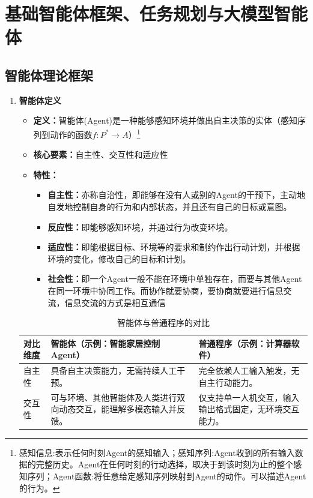 \documentclass[../main.tex]{subfiles}
\begin{document}
\section{基础智能体框架、任务规划与大模型智能体}\label{sec:agent-framework}
\subsection{智能体理论框架}\label{sec:agent-theory}
\begin{enumerate}
    \item \textbf{智能体定义}
    \begin{itemize}
        \item \textbf{定义：}智能体(Agent)是一种能够感知环境并做出自主决策的实体（感知序列到动作的函数$f:P^*\rightarrow A$）\footnote{感知信息:表示任何时刻Agent的感知输入；感知序列:Agent收到的所有输入数据的完整历史。Agent在任何时刻的行动选择，取决于到该时刻为止的整个感知序列；Agent函数:将任意给定感知序列映射到Agent的动作。可以描述Agent的行为。}
        \item \textbf{核心要素：}自主性、交互性和适应性
        \item \textbf{特性：}
        \begin{itemize}
            \item \textbf{自主性：}亦称自治性，即能够在没有人或别的Agent的干预下，主动地自发地控制自身的行为和内部状态，并且还有自己的目标或意图。
            \item \textbf{反应性：}即能够感知环境，并通过行为改变环境。
            \item \textbf{适应性：}即能根据目标、环境等的要求和制约作出行动计划，并根据环境的变化，修改自己的目标和计划。
            \item \textbf{社会性：}即一个Agent一般不能在环境中单独存在，而要与其他Agent在同一环境中协同工作。而协作就要协商，要协商就要进行信息交流，信息交流的方式是相互通信
        \end{itemize}
    \end{itemize}
    \begin{table}[H]
    \centering
    \caption{智能体与普通程序的对比}
    \begin{tabular}{p{2.6cm}p{6.2cm}p{6.2cm}}
        \toprule
        对比维度 & 智能体（示例：智能家居控制 Agent） & 普通程序（示例：计算器软件） \\
        \midrule
        自主性 & 具备自主决策能力，无需持续人工干预。 & 完全依赖人工输入触发，无自主行动能力。 \\
        交互性 & 可与环境、其他智能体及人类进行双向动态交互，能理解多模态输入并反馈。 & 仅支持单一人机交互，输入输出格式固定，无环境交互能力。 \\

\end{tabular}
\end{table}
\end{enumerate}
\end{document}
